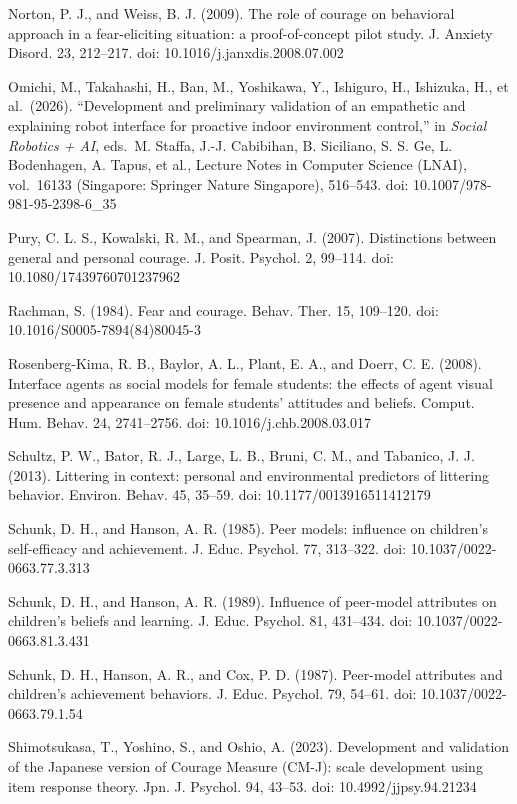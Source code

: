 Norton, P. J., and Weiss, B. J. (2009). The role of courage on
behavioral approach in a fear-eliciting situation: a proof-of-concept
pilot study. J. Anxiety Disord. 23, 212--217. doi:
10.1016/j.janxdis.2008.07.002

Omichi, M., Takahashi, H., Ban, M., Yoshikawa, Y., Ishiguro, H.,
Ishizuka, H., et al.~(2026). ``Development and preliminary validation of
an empathetic and explaining robot interface for proactive indoor
environment control,'' in \emph{Social Robotics + AI}, eds.~M. Staffa,
J.-J. Cabibihan, B. Siciliano, S. S. Ge, L. Bodenhagen, A. Tapus, et
al., Lecture Notes in Computer Science (LNAI), vol.~16133 (Singapore:
Springer Nature Singapore), 516--543. doi: 10.1007/978-981-95-2398-6\_35

Pury, C. L. S., Kowalski, R. M., and Spearman, J. (2007). Distinctions
between general and personal courage. J. Posit. Psychol. 2, 99--114.
doi: 10.1080/17439760701237962

Rachman, S. (1984). Fear and courage. Behav. Ther. 15, 109--120. doi:
10.1016/S0005-7894(84)80045-3

Rosenberg-Kima, R. B., Baylor, A. L., Plant, E. A., and Doerr, C. E.
(2008). Interface agents as social models for female students: the
effects of agent visual presence and appearance on female students'
attitudes and beliefs. Comput. Hum. Behav. 24, 2741--2756. doi:
10.1016/j.chb.2008.03.017

Schultz, P. W., Bator, R. J., Large, L. B., Bruni, C. M., and Tabanico,
J. J. (2013). Littering in context: personal and environmental
predictors of littering behavior. Environ. Behav. 45, 35--59. doi:
10.1177/0013916511412179

Schunk, D. H., and Hanson, A. R. (1985). Peer models: influence on
children's self-efficacy and achievement. J. Educ. Psychol. 77,
313--322. doi: 10.1037/0022-0663.77.3.313

Schunk, D. H., and Hanson, A. R. (1989). Influence of peer-model
attributes on children's beliefs and learning. J. Educ. Psychol. 81,
431--434. doi: 10.1037/0022-0663.81.3.431

Schunk, D. H., Hanson, A. R., and Cox, P. D. (1987). Peer-model
attributes and children's achievement behaviors. J. Educ. Psychol. 79,
54--61. doi: 10.1037/0022-0663.79.1.54

Shimotsukasa, T., Yoshino, S., and Oshio, A. (2023). Development and
validation of the Japanese version of Courage Measure (CM-J): scale
development using item response theory. Jpn. J. Psychol. 94, 43--53.
doi: 10.4992/jjpsy.94.21234

